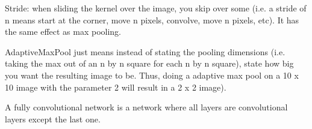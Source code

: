 \documentclass[12pt]{article}
\begin{document}
Stride: when sliding the kernel over the image, you skip over some (i.e. a stride of n means start at the corner, move n pixels, convolve, move n pixels, etc). It has the same effect as max pooling.

AdaptiveMaxPool just means instead of stating the pooling dimensions (i.e. taking the max out of an n by n square for each n by n square), state how big you want the resulting image to be. Thus, doing a adaptive max pool on a 10 x 10 image with the parameter 2 will result in a 2 x 2 image).

A fully convolutional network is a network where all layers are convolutional layers except the last one.
\end{document}
